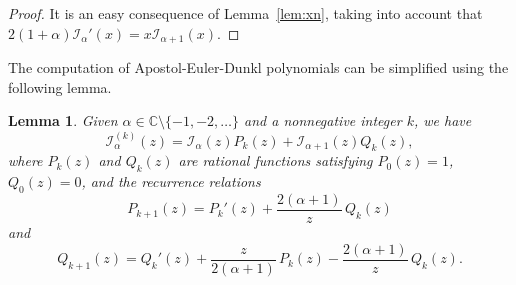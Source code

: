 \documentclass[10pt,a4paper]{article}
\theoremstyle{plain}
\newtheorem{lemma}[theorem]{Lemma}
\theoremstyle{definition}
\numberwithin{equation}{section} %
\newcommand{\I}{\mathcal{I}}
\newcommand{\CC}{\mathbb{C}}
\begin{document}
\begin{proof}
It is an easy consequence of Lemma~\ref{lem:xn}, taking into account that $2(1+\alpha)\I_\alpha'(x) = x\I_{\alpha+1}(x)$.
\end{proof}

The computation of Apostol-Euler-Dunkl polynomials can be simplified using the following lemma.

\begin{lemma}
\label{lem:der}
Given $\alpha\in\CC \setminus \{-1,-2,\dots \}$ and a nonnegative integer $k$, we have
\begin{equation}
\label{eq:der}
  \I_\alpha^{(k)}(z) = \I_\alpha(z) P_k(z) + \I_{\alpha+1}(z) Q_k(z),
\end{equation}
where $P_k(z)$ and $Q_k(z)$ are rational functions satisfying
$P_0(z)=1$, $Q_0(z)=0$, and the recurrence relations
\[
  P_{k+1}(z) = P_{k}'(z) + \frac{2(\alpha+1)}{z}\,Q_k(z)
\]
and
\[
  Q_{k+1}(z) = Q_k'(z) + \frac{z}{2(\alpha+1)}\,P_k(z) - \frac{2(\alpha+1)}{z}\,Q_k(z).
\]
\end{lemma}
\end{document}
